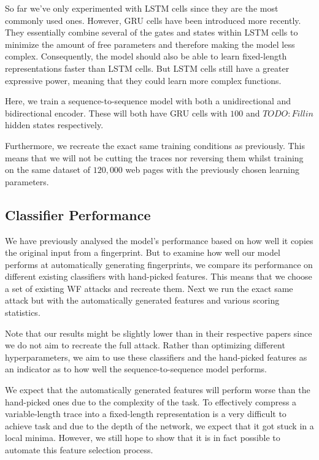 So far we've only experimented with LSTM cells since they are the most commonly used ones.
However, GRU cells have been introduced more recently.
They essentially combine several of the gates and states within LSTM cells to minimize the amount of free parameters and therefore making the model less complex.
Consequently, the model should also be able to learn fixed-length representations faster than LSTM cells.
But LSTM cells still have a greater expressive power, meaning that they could learn more complex functions.

Here, we train a sequence-to-sequence model with both a unidirectional and bidirectional encoder.
These will both have GRU cells with $100$ and $TODO: Fill in$ hidden states respectively.

Furthermore, we recreate the exact same training conditions as previously.
This means that we will not be cutting the traces nor reversing them whilst training on the same dataset of $120,000$ web pages with the previously chosen learning parameters.


\subsection{Classifier Performance}

We have previously analysed the model's performance based on how well it copies the original input from a fingerprint.
But to examine how well our model performs at automatically generating fingerprints, we compare its performance on different existing classifiers with hand-picked features.
This means that we choose a set of existing WF attacks and recreate them.
Next we run the exact same attack but with the automatically generated features and various scoring statistics.

Note that our results might be slightly lower than in their respective papers since we do not aim to recreate the full attack.
Rather than optimizing different hyperparameters, we aim to use these classifiers and the hand-picked features as an indicator as to how well the sequence-to-sequence model performs.

We expect that the automatically generated features will perform worse than the hand-picked ones due to the complexity of the task.
To effectively compress a variable-length trace into a fixed-length representation is a very difficult to achieve task and due to the depth of the network, we expect that it got stuck in a local minima.
However, we still hope to show that it is in fact possible to automate this feature selection process.

